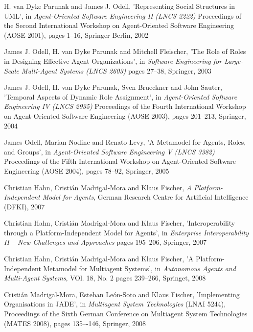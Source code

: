 \begin{thebibliography}{99}
H. van Dyke Parunak and James J. Odell,
'Representing Social Structures in UML',
in \textit{Agent-Oriented Software Engineering II (LNCS 2222)}
Proceedings of the Second International Workshop on Agent-Oriented Software Engineering (AOSE 2001),
pages 1--16,
Springer Berlin, 2002

James J. Odell, H. van Dyke Parunak and Mitchell Fleischer,
'The Role of Roles in Designing Effective Agent Organizations',
in \textit{Software Engineering for Large-Scale Multi-Agent Systems (LNCS 2603)}
pages 27--38,
Springer, 2003

James J. Odell, H. van Dyke Parunak, Sven Brueckner and John Sauter,
'Temporal Aspects of Dynamic Role Assignment',
in \textit{Agent-Oriented Software Engineering IV (LNCS 2935)}
Proceedings of the Fourth International Workshop on Agent-Oriented Software Engineering (AOSE 2003),
pages 201--213,
Springer, 2004

James Odell, Marian Nodine and Renato Levy,
'A Metamodel for Agents, Roles, and Groups',
in \textit{Agent-Oriented Software Engineering V (LNCS 3382)}
Proceedings of the Fifth International Workshop on Agent-Oriented Software Engineering (AOSE 2004),
pages 78--92,
Springer, 2005


Christian Hahn, Cristián Madrigal-Mora and Klaus Fischer,
\textit{A Platform-Independent Model for Agents},
German Research Centre for Artificial Intelligence (DFKI), 2007

Christian Hahn, Cristián Madrigal-Mora and Klaus Fischer,
'Interoperability through a Platform-Independent Model for Agents',
in \textit{Enterprise Interoperability II -- New Challenges and Approaches}
pages 195--206,
Springer, 2007

Christian Hahn, Cristián Madrigal-Mora and Klaus Fischer,
'A Platform-Independent Metamodel for Multiagent Systems',
in \textit{Autonomous Agents and Multi-Agent Systems}, VOl. 18, No. 2
pages 239--266,
Springet, 2008

Cristián Madrigal-Mora, Esteban León-Soto and Klaus Fischer,
'Implementing Organisations in JADE',
in \textit{Multiagent System Technologies} (LNAI 5244),
Proceedings of the Sixth German Conference on Multiagent System Technologies (MATES 2008),
pages 135–-146,
Springer, 2008


\end{thebibliography}
